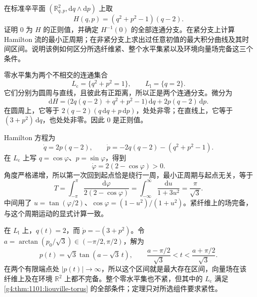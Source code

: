 \BookExercises
\begin{exercise}\label{g4:ex:11:compact-component-only}
	在标准辛平面 \((\mathbb R^2_{q,p},\mathrm{d}q\wedge\mathrm{d}p)\) 上取
	\[
		H(q,p)=(q^2+p^2-1)(q-2).
	\]
	证明 \(0\) 为 \(H\) 的正则值，并确定 \(H^{-1}(0)\) 的全部连通分支。在紧分支上计算 Hamilton 流的最小正周期；在非紧分支上求出过任意初值的最大积分曲线及其时间区间。说明该例如何区分所选纤维紧、整个水平集紧以及环境向量场完备这三个条件。
\end{exercise}
\begin{solution}
	零水平集为两个不相交的连通集合
	\[
		L_{\mathrm c}=\{q^2+p^2=1\},\qquad
		L_{\mathrm l}=\{q=2\}.
	\]
	它们分别为圆周与直线，且彼此有正距离，所以正是两个连通分支。微分为
	\[
		\mathrm{d}H=
		\bigl(2q(q-2)+q^2+p^2-1\bigr)\,\mathrm{d}q
		+2p(q-2)\,\mathrm{d}p.
	\]
	在圆周上，它等于 \(2(q-2)(q\,\mathrm{d}q+p\,\mathrm{d}p)\)，处处非零；在直线上，它等于 \((3+p^2)\,\mathrm{d}q\)，也处处非零。因此 \(0\) 是正则值。

	Hamilton 方程为
	\[
		\dot q=2p(q-2),\qquad
		\dot p=-2q(q-2)-(q^2+p^2-1).
	\]
	在 \(L_{\mathrm c}\) 上写 \(q=\cos\varphi\)、\(p=\sin\varphi\)，得到
	\[
		\dot\varphi=2(2-\cos\varphi)>0.
	\]
	角度严格递增，所以第一次回到起点恰是绕行一周，最小正周期与起点无关，等于
	\[
		T=\int_{-\pi}^{\pi}\frac{\mathrm{d}\varphi}{2(2-\cos\varphi)}
		=\int_{-\infty}^{\infty}\frac{\mathrm{d}u}{1+3u^2}
		=\frac{\pi}{\sqrt3}.
	\]
	中间用了 \(u=\tan(\varphi/2)\)、\(\cos\varphi=(1-u^2)/(1+u^2)\)。紧纤维上的场完备，与这个周期运动的显式计算一致。

	在 \(L_{\mathrm l}\) 上，\(q(t)=2\)，而 \(\dot p=-(3+p^2)\)。令 \(a=\arctan(p_0/\sqrt3)\in(-\pi/2,\pi/2)\)，解为
	\[
		p(t)=\sqrt3\tan(a-\sqrt3\,t),\qquad
		\frac{a-\pi/2}{\sqrt3}<t<\frac{a+\pi/2}{\sqrt3}.
	\]
	在两个有限端点处 \(|p(t)|\to\infty\)，所以这个区间就是最大存在区间，向量场在该纤维上及在环境 \(\mathbb R^2\) 上都不完备。整个零水平集也不紧，但其中的 \(L_{\mathrm c}\) 满足 \cref{g4:thm:1101:liouville-torus} 的全部条件；定理只对所选组件要求紧性。
\end{solution}

